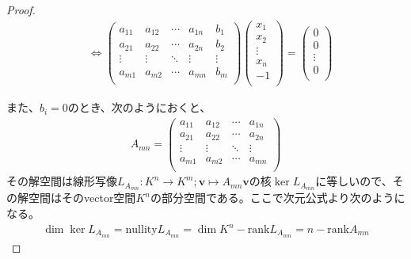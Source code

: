 \documentclass[dvipdfmx]{jsarticle}
\begin{document}
\begin{proof}
\begin{align*}
&\Leftrightarrow \begin{pmatrix}
a_{11} & a_{12} & \cdots & a_{1n} & b_{1} \\
a_{21} & a_{22} & \cdots & a_{2n} & b_{2} \\
 \vdots & \vdots & \ddots & \vdots & \vdots \\
a_{m1} & a_{m2} & \cdots & a_{mn} & b_{m} \\
\end{pmatrix}\begin{pmatrix}
x_{1} \\
x_{2} \\
 \vdots \\
x_{n} \\
 - 1 \\
\end{pmatrix} = \begin{pmatrix}
0 \\
0 \\
 \vdots \\
0 \\
\end{pmatrix}
\end{align*}\par
また、$b_{i} = 0$のとき、次のようにおくと、
\begin{align*}
A_{mn} = \begin{pmatrix}
a_{11} & a_{12} & \cdots & a_{1n} \\
a_{21} & a_{22} & \cdots & a_{2n} \\
 \vdots & \vdots & \ddots & \vdots \\
a_{m1} & a_{m2} & \cdots & a_{mn} \\
\end{pmatrix}
\end{align*}
その解空間は線形写像$L_{A_{mn}}:K^{n} \rightarrow K^{m};\mathbf{v} \mapsto A_{mn}\mathbf{v}$の核$\ker L_{A_{mn}}$に等しいので、その解空間はそのvector空間$K^{n}$の部分空間である。ここで次元公式より次のようになる。
\begin{align*}
\dim{\ker L_{A_{mn}}} = {\mathrm{nullity}}L_{A_{mn}} = \dim K^{n} - {\mathrm{rank}}L_{A_{mn}} = n - {\mathrm{rank}}A_{mn}
\end{align*}
\end{proof}
\end{document}

